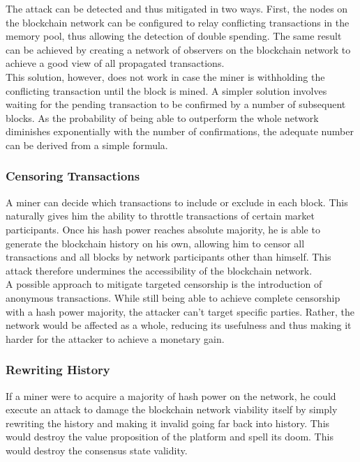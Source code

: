 \documentclass[12pt,a4paper]{article}
\begin{document}
The attack can be detected and thus mitigated in two ways. First, the nodes on the blockchain network can be configured to relay conflicting transactions in the memory pool, thus allowing the detection of double spending. The same result can be achieved by creating a network of observers on the blockchain network to achieve a good view of all propagated transactions.\\

This solution, however, does not work in case the miner is withholding the conflicting transaction until the block is mined. A simpler solution involves waiting for the pending transaction to be confirmed by a number of subsequent blocks. As the probability of being able to outperform the whole network diminishes exponentially with the number of confirmations, the adequate number can be derived from a simple formula.\\

\subsubsection{Censoring Transactions}

A miner can decide which transactions to include or exclude in each block. This naturally gives him the ability to throttle transactions of certain market participants. Once his hash power reaches absolute majority, he is able to generate the blockchain history on his own, allowing him to censor all transactions and all blocks by network participants other than himself. This attack therefore undermines the accessibility of the blockchain network.\\

A possible approach to mitigate targeted censorship is the introduction of anonymous transactions. While still being able to achieve complete censorship with a hash power majority, the attacker can't target specific parties. Rather, the network would be affected as a whole, reducing its usefulness and thus making it harder for the attacker to achieve a monetary gain.\\

\subsubsection{Rewriting History}

If a miner were to acquire a majority of hash power on the network, he could execute an attack to damage the blockchain network viability itself by simply rewriting the history and making it invalid going far back into history. This would destroy the value proposition of the platform and spell its doom. This would destroy the consensus state validity.\\
\end{document}
